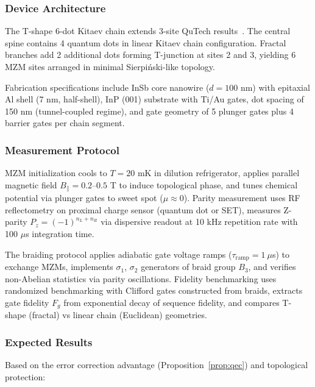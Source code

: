 \subsubsection{Device Architecture}

The T-shape 6-dot Kitaev chain extends 3-site QuTech results~\cite{QuTech2025}. The central spine contains 4 quantum dots in linear Kitaev chain configuration. Fractal branches add 2 additional dots forming T-junction at sites 2 and 3, yielding 6 MZM sites arranged in minimal Sierpi\'{n}ski-like topology.

Fabrication specifications include InSb core nanowire ($d = 100$ nm) with epitaxial Al shell (7 nm, half-shell), InP (001) substrate with Ti/Au gates, dot spacing of 150 nm (tunnel-coupled regime), and gate geometry of 5 plunger gates plus 4 barrier gates per chain segment.

\subsubsection{Measurement Protocol}

MZM initialization cools to $T = 20$ mK in dilution refrigerator, applies parallel magnetic field $B_\parallel = 0.2$--$0.5$ T to induce topological phase, and tunes chemical potential via plunger gates to sweet spot ($\mu \approx 0$). Parity measurement uses RF reflectometry on proximal charge sensor (quantum dot or SET), measures Z-parity $P_z = (-1)^{n_L + n_R}$ via dispersive readout at 10 kHz repetition rate with 100 $\mu$s integration time.

The braiding protocol applies adiabatic gate voltage ramps ($\tau_{\mathrm{ramp}} = 1~\mu$s) to exchange MZMs, implements $\sigma_1$, $\sigma_2$ generators of braid group $B_3$, and verifies non-Abelian statistics via parity oscillations. Fidelity benchmarking uses randomized benchmarking with Clifford gates constructed from braids, extracts gate fidelity $F_g$ from exponential decay of sequence fidelity, and compares T-shape (fractal) vs linear chain (Euclidean) geometries.

\subsubsection{Expected Results}

Based on the error correction advantage (Proposition~\ref{prop:qec}) and topological protection:

